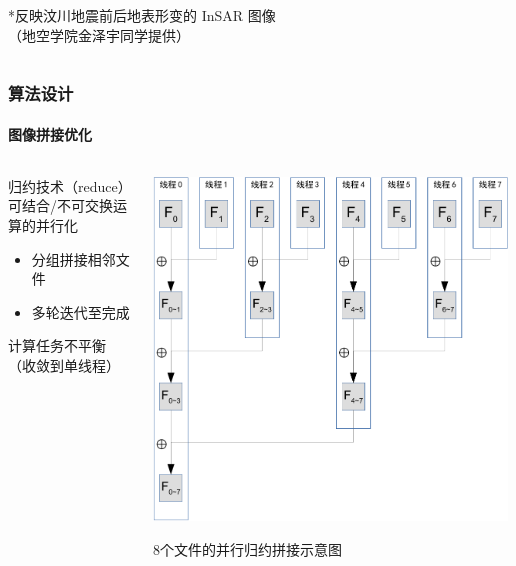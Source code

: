 \documentclass{beamer}
\begin{document}
\begin{frame}
\begin{columns}
\begin{column}{0.5\textwidth}
            \begin{tiny}
            *反映汶川地震前后地表形变的 InSAR 图像 \\
            （地空学院金泽宇同学提供）
            \end{tiny}
        \end{column}
    \end{columns}
\end{frame}


\begin{frame}
    \frametitle{算法设计}
    \framesubtitle{图像拼接优化}

    \begin{columns}
        \begin{column}{0.5\textwidth}
            \begin{block}{归约技术（reduce）}
                \small
                可结合/不可交换运算的并行化
                \begin{itemize}
                    \item 分组拼接相邻文件
                    \item 多轮迭代至完成
                \end{itemize}
                计算任务不平衡（收敛到单线程）
            \end{block}
        \end{column}
        \begin{column}{0.5\textwidth}
            \centering
            \includegraphics[width=0.99\textwidth]{figures/reduce-ppt.pdf}
            \begin{tiny}
            8个文件的并行归约拼接示意图
            \end{tiny}
        \end{column}
    \end{columns}
\end{frame}
\end{document}
